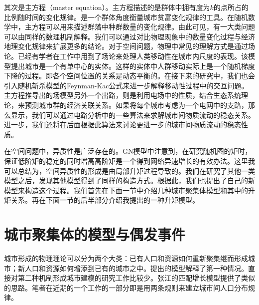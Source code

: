 其次是主方程（master equation）。主方程描述的是群体中拥有度为$k$的点所占的比例随时间的变化规律。是一个群体角度衡量城市贫富变化规律的工具。在随机数学中，主方程可以用来描述群落中种群数量的变化规律。由此可见，有一大类问题可以由同样的数理机制解释。我们可以通过对比物理现象中的数量变化过程与经济地理变化规律来扩展更多的结论。对于空间问题，物理中常见的理解方式是通过场论。已经有学者在工作中用到了场论来处理人类移动性在城市内尺度的表现\cite{molas2017field}。该模型提出城市是一个有单中心的实体。这样的实体中人群移动实际上是一个随机梯度下降的过程。即各个空间位置的关系是动态平衡的。在接下来的研究中，我们也会引入随机斩杀模型的Feynman-Kac公式\cite{PhysRevE.98.052114}来进一步解释移动性过程中的交互问题。主方程推导出的场模型另外一个出路，则是利用电场中的性质，结合生态系统理论，来预测城市群的经济关联关系。如果将每个城市考虑为一个电网中的支路，那么\cite{doyle1984random,Volchenkov2011Random}显示，我们可以通过电路分析中的一些算法来求解城市间物质流动的稳态关系。进一步，我们还将在后面根据此算法来讨论更进一步的城市间物质流动的稳态性质。

在空间问题中，异质性是广泛存在的。GN模型中注意到，在研究随机图的矩时，保证低阶矩的稳定的同时增高高阶矩是一个得到网络异速增长的有效办法。这里我可以总结为，空间异质性的形成是由局部升矩过程导致的。我们在研究了其他一类模型之后，发现其他模型得到了同样的构造方式。根据此，我们也提出了自己的新模型来构造这个过程。我们首先在下面一节中介绍几种城市聚集体模型和其中的升矩关系。再在下面一节的后半部分介绍我提出的一种升矩模型。

\section{城市聚集体的模型与偶发事件}

城市形成的物理理论可以分为两个大类：已有人口和资源如何重新聚集继而形成城市；新人口和资源如何增添到已有的城市之中。\cite{PhysRevLett.79.523,PhysRevE.58.295,PhysRevLett.112.240601}提出的模型解释了第一种情况。直接对第二种机制形成城市建模的研究工作比较少。张江\cite{ZhangScaling,LiSimple}的匹配增长模型提供了类似的思路。笔者在近期的一个工作的一部分即是用两条规则来建立城市间人口分布规律。

